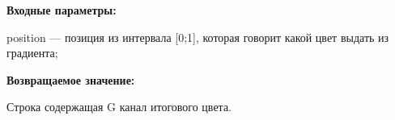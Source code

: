 \textbf{Входные параметры:}  

position --- позиция из интервала [0;1], которая говорит какой цвет выдать из градиента;

\textbf{Возвращаемое значение:}

Строка содержащая G канал итогового цвета.